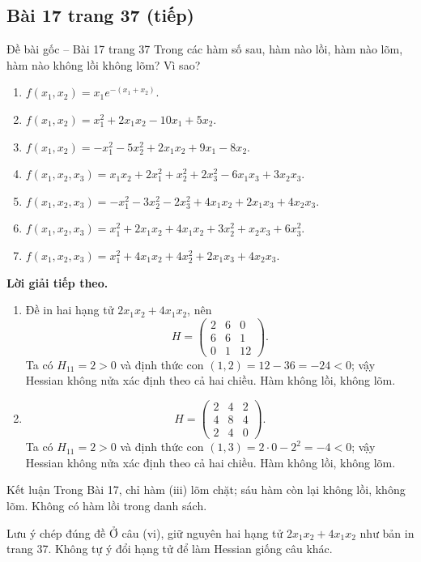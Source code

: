 \documentclass[11pt,a4paper]{article}
\begin{document}
\subsection*{Bài 17 trang 37 (tiếp)}
\begin{questionbox}{Đề bài gốc -- Bài 17 trang 37}
Trong các hàm số sau, hàm nào lồi, hàm nào lõm, hàm nào không lồi không lõm? Vì sao?
\begin{enumerate}[label=\roman*),nosep,leftmargin=*]
\item \(f(x_1,x_2)=x_1e^{-(x_1+x_2)}\).
\item \(f(x_1,x_2)=x_1^2+2x_1x_2-10x_1+5x_2\).
\item \(f(x_1,x_2)=-x_1^2-5x_2^2+2x_1x_2+9x_1-8x_2\).
\item \(f(x_1,x_2,x_3)=x_1x_2+2x_1^2+x_2^2+2x_3^2-6x_1x_3+3x_2x_3\).
\item \(f(x_1,x_2,x_3)=-x_1^2-3x_2^2-2x_3^2+4x_1x_2+2x_1x_3+4x_2x_3\).
\item \(f(x_1,x_2,x_3)=x_1^2+2x_1x_2+4x_1x_2+3x_2^2+x_2x_3+6x_3^2\).
\item \(f(x_1,x_2,x_3)=x_1^2+4x_1x_2+4x_2^2+2x_1x_3+4x_2x_3\).
\end{enumerate}
\end{questionbox}
\textbf{Lời giải tiếp theo.}
\begin{enumerate}[label=\roman*),start=6,leftmargin=*,itemsep=.45em]
\item Đề in hai hạng tử \(2x_1x_2+4x_1x_2\), nên
\[
H=\begin{pmatrix}2&6&0\\6&6&1\\0&1&12\end{pmatrix}.
\]
Ta có \(H_{11}=2>0\) và định thức con \((1,2)=12-36=-24<0\); vậy Hessian không nửa xác định theo cả hai chiều. Hàm không lồi, không lõm.
\item \[
H=\begin{pmatrix}2&4&2\\4&8&4\\2&4&0\end{pmatrix}.
\]
Ta có \(H_{11}=2>0\) và định thức con \((1,3)=2\cdot0-2^2=-4<0\); vậy Hessian không nửa xác định theo cả hai chiều. Hàm không lồi, không lõm.
\end{enumerate}
\begin{answerbox}{Kết luận}
Trong Bài 17, chỉ hàm (iii) lõm chặt; sáu hàm còn lại không lồi, không lõm. Không có hàm lồi trong danh sách.
\end{answerbox}
\begin{warningbox}{Lưu ý chép đúng đề}
Ở câu (vi), giữ nguyên hai hạng tử \(2x_1x_2+4x_1x_2\) như bản in trang 37. Không tự ý đổi hạng tử để làm Hessian giống câu khác.
\end{warningbox}
\clearpage
\end{document}
